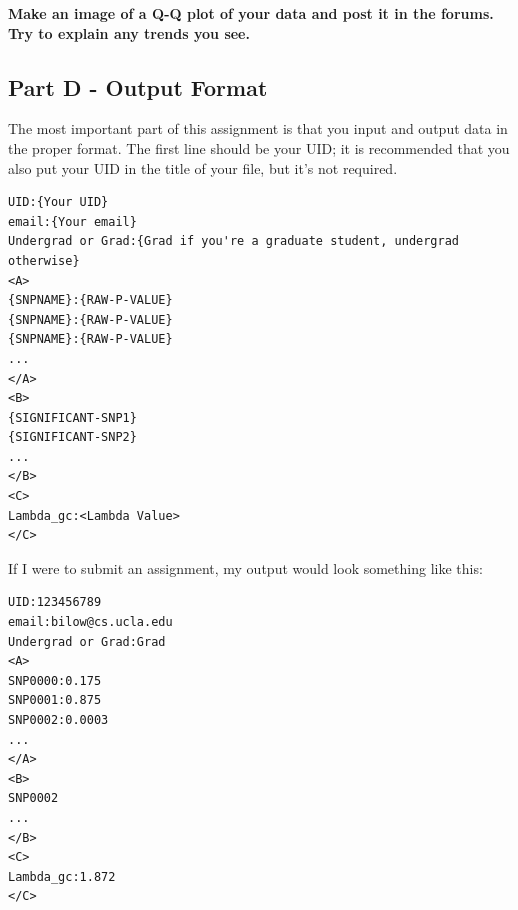 \documentclass{article}
\begin{document}
\textbf{Make an image of a Q-Q plot of your data and post it in the forums. Try to explain any trends you see.}

\clearpage
\subsection*{Part D - Output Format}
The most important part of this assignment is that you
input and output data in the proper format. The first line
should be your UID; it is recommended that you also put
your UID in the title of your file, but it's not required.

\begin{verbatim}
UID:{Your UID}
email:{Your email}
Undergrad or Grad:{Grad if you're a graduate student, undergrad otherwise}
<A>
{SNPNAME}:{RAW-P-VALUE}
{SNPNAME}:{RAW-P-VALUE}
{SNPNAME}:{RAW-P-VALUE}
...
</A>
<B>
{SIGNIFICANT-SNP1}
{SIGNIFICANT-SNP2}
...
</B>
<C>
Lambda_gc:<Lambda Value>
</C>
\end{verbatim}

If I were to submit an assignment, my output
would look something like this:

\begin{verbatim}
UID:123456789
email:bilow@cs.ucla.edu
Undergrad or Grad:Grad
<A>
SNP0000:0.175
SNP0001:0.875
SNP0002:0.0003
...
</A>
<B>
SNP0002
...
</B>
<C>
Lambda_gc:1.872
</C>
\end{verbatim}


\clearpage
\end{document}
